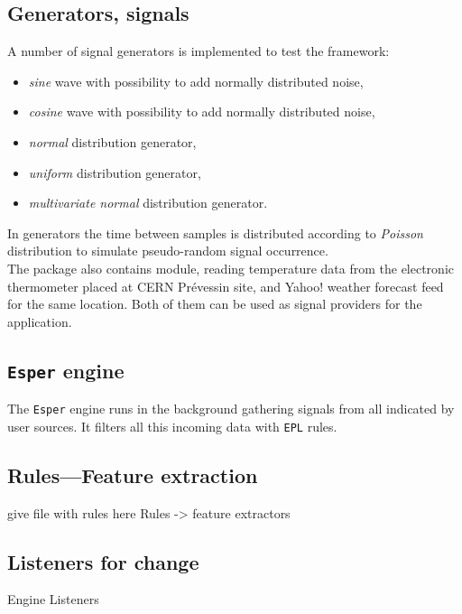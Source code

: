 \documentclass[11pt, letterpaper]{article}            %
\begin{document}
\subsection{Generators, signals}
A number of signal generators is implemented to test the framework:
\begin{itemize}
	\item \emph{sine} wave with possibility to add normally distributed noise,
	\item \emph{cosine} wave with possibility to add normally distributed noise,
	\item \emph{normal} distribution generator,
	\item \emph{uniform} distribution generator,
	\item \emph{multivariate normal} distribution generator.
\end{itemize}
In generators the time between samples is distributed according to \emph{Poisson} distribution to simulate pseudo-random signal occurrence.\\

The package also contains module, reading temperature data from the electronic thermometer placed at CERN Prévessin site, and Yahoo! weather forecast feed for the same location. Both of them can be used as signal providers for the application.

\subsection{\texttt{Esper} engine}
The \texttt{Esper} engine runs in the background gathering signals from all indicated by user sources. It filters all this incoming data with \texttt{EPL} rules.

\subsection{Rules---Feature extraction}
give file with rules here
Rules -> feature extractors\\

\subsection{Listeners for change}
Engine Listeners\\
\end{document}
